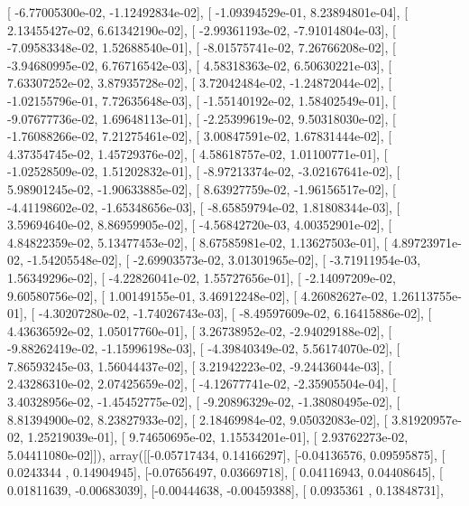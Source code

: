\documentclass{article}
\begin{document}
       [ -6.77005300e-02,  -1.12492834e-02],
       [ -1.09394529e-01,   8.23894801e-04],
       [  2.13455427e-02,   6.61342190e-02],
       [ -2.99361193e-02,  -7.91014804e-03],
       [ -7.09583348e-02,   1.52688540e-01],
       [ -8.01575741e-02,   7.26766208e-02],
       [ -3.94680995e-02,   6.76716542e-03],
       [  4.58318363e-02,   6.50630221e-03],
       [  7.63307252e-02,   3.87935728e-02],
       [  3.72042484e-02,  -1.24872044e-02],
       [ -1.02155796e-01,   7.72635648e-03],
       [ -1.55140192e-02,   1.58402549e-01],
       [ -9.07677736e-02,   1.69648113e-01],
       [ -2.25399619e-02,   9.50318030e-02],
       [ -1.76088266e-02,   7.21275461e-02],
       [  3.00847591e-02,   1.67831444e-02],
       [  4.37354745e-02,   1.45729376e-02],
       [  4.58618757e-02,   1.01100771e-01],
       [ -1.02528509e-02,   1.51202832e-01],
       [ -8.97213374e-02,  -3.02167641e-02],
       [  5.98901245e-02,  -1.90633885e-02],
       [  8.63927759e-02,  -1.96156517e-02],
       [ -4.41198602e-02,  -1.65348656e-03],
       [ -8.65859794e-02,   1.81808344e-03],
       [  3.59694640e-02,   8.86959905e-02],
       [ -4.56842720e-03,   4.00352901e-02],
       [  4.84822359e-02,   5.13477453e-02],
       [  8.67585981e-02,   1.13627503e-01],
       [  4.89723971e-02,  -1.54205548e-02],
       [ -2.69903573e-02,   3.01301965e-02],
       [ -3.71911954e-03,   1.56349296e-02],
       [ -4.22826041e-02,   1.55727656e-01],
       [ -2.14097209e-02,   9.60580756e-02],
       [  1.00149155e-01,   3.46912248e-02],
       [  4.26082627e-02,   1.26113755e-01],
       [ -4.30207280e-02,  -1.74026743e-03],
       [ -8.49597609e-02,   6.16415886e-02],
       [  4.43636592e-02,   1.05017760e-01],
       [  3.26738952e-02,  -2.94029188e-02],
       [ -9.88262419e-02,  -1.15996198e-03],
       [ -4.39840349e-02,   5.56174070e-02],
       [  7.86593245e-03,   1.56044437e-02],
       [  3.21942223e-02,  -9.24436044e-03],
       [  2.43286310e-02,   2.07425659e-02],
       [ -4.12677741e-02,  -2.35905504e-04],
       [  3.40328956e-02,  -1.45452775e-02],
       [ -9.20896329e-02,  -1.38080495e-02],
       [  8.81394900e-02,   8.23827933e-02],
       [  2.18469984e-02,   9.05032083e-02],
       [  3.81920957e-02,   1.25219039e-01],
       [  9.74650695e-02,   1.15534201e-01],
       [  2.93762273e-02,   5.04411080e-02]]), array([[-0.05717434,  0.14166297],
       [-0.04136576,  0.09595875],
       [ 0.0243344 ,  0.14904945],
       [-0.07656497,  0.03669718],
       [ 0.04116943,  0.04408645],
       [ 0.01811639, -0.00683039],
       [-0.00444638, -0.00459388],
       [ 0.0935361 ,  0.13848731],
\end{document}
